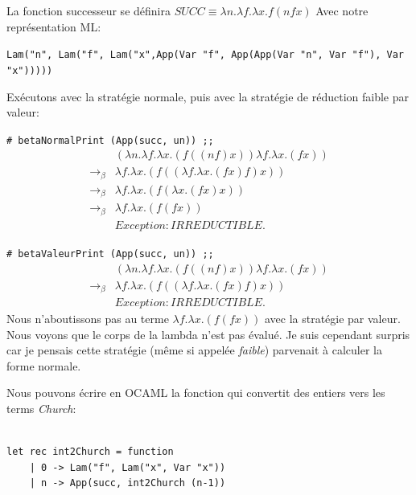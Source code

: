 La fonction successeur se définira $SUCC \equiv \lambda n.\lambda f.\lambda x.f (n f x)$
Avec notre représentation ML: 

\verb+Lam("n", Lam("f", Lam("x",App(Var "f", App(App(Var "n", Var "f"), Var "x")))))+

Exécutons avec la stratégie normale, puis avec la stratégie de réduction faible par valeur:


\verb+# betaNormalPrint (App(succ, un)) ;;+
$$
\begin{array}{ll}
& (\lambda n . \lambda f . \lambda x . (f((nf)x))\lambda f . \lambda x . (fx))   \\
\rightarrow _\beta & \lambda f . \lambda x . (f((\lambda f . \lambda x . (fx)f)x))   \\
\rightarrow _\beta & \lambda f . \lambda x . (f(\lambda x . (fx)x))   \\
\rightarrow _\beta & \lambda f . \lambda x . (f(fx))   \\
& Exception: IRREDUCTIBLE.
\end{array}
$$

\verb+# betaValeurPrint (App(succ, un)) ;;+
$$
\begin{array}{ll}
& (\lambda n . \lambda f . \lambda x . (f((nf)x))\lambda f . \lambda x . (fx))   \\
\rightarrow _\beta & \lambda f . \lambda x . (f((\lambda f . \lambda x . (fx)f)x))   \\
& Exception: IRREDUCTIBLE.
\end{array} 
$$
Nous n'aboutissons pas au terme $\lambda f . \lambda x . (f(fx)) $ avec la stratégie par valeur. Nous voyons que le corps de la lambda
n'est pas évalué. Je suis cependant surpris car je pensais cette stratégie (même si appelée \textit{faible}) parvenait à calculer la
forme normale.

Nous pouvons écrire en OCAML la fonction qui convertit des entiers vers les terms \textit{Church}:
\begin{Verbatim}

let rec int2Church = function
	| 0 -> Lam("f", Lam("x", Var "x"))
	| n -> App(succ, int2Church (n-1))
\end{Verbatim}

